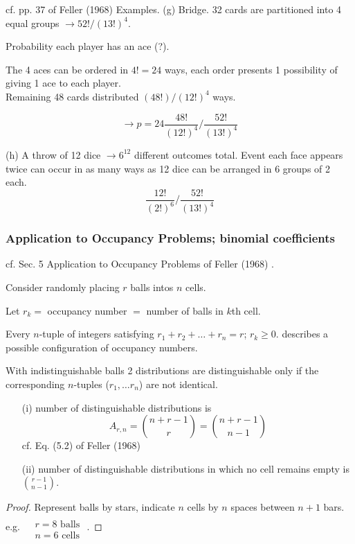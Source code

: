 \documentclass[10pt]{amsart}
\begin{document}
\begin{multicols*}{2}
cf. pp. 37 of Feller (1968)  \cite{Fell1968}
Examples.  (g) Bridge.  32 cards are partitioned into 4 equal groups $\to 52!/(13!)^4$.  

Probability each player has an ace (?).  

The 4 aces can be ordered in $4! = 24$ ways, each order presents 1 possibility of giving 1 ace to each player.  \\
Remaining 48 cards distributed $(48!)/( 12!)^4$ ways.  

\[
\to p = 24 \frac{ 48!}{ (12!)^4 } / \frac{ 52!}{ (13!)^4}
\]

(h) A throw of 12 dice $\to  6^{12}$ different outcomes total.  Event each face appears twice can occur in as many ways as 12 dice can be arranged in 6 groups of 2 each.  
\[
\frac{12!}{(2!)^6} / \frac{ 52!}{ (13!)^4} 
\]

\subsubsection{Application to Occupancy Problems; binomial coefficients}

cf. Sec. 5 Application to Occupancy Problems of Feller (1968)  \cite{Fell1968}.  

Consider randomly placing $r$ balls intos $n$ cells.  

Let $r_k = $ occupancy number $=$ number of balls in $k$th cell.  

Every $n$-tuple of integers satisfying $r_1 + r_2 + \dots + r_n = r$;  $r_k \geq 0$.  describes a possible configuration of occupancy numbers.  

With indistinguishable balls 2 distributions are distinguishable only if the corresponding $n$-tuples ($r_1,\dots r_n$) are not identical.  

\begin{enumerate}
\item[(i)] number of distinguishable distributions is 
\begin{equation}
A_{r,n} = \binom{n+r-1}{r} = \binom{n+r-1}{n-1}  
\end{equation} cf. Eq. (5.2) of Feller (1968)  \cite{Fell1968}
\item[(ii)]  number of distinguishable distributions in which no cell remains empty is $\binom{r-1}{n-1}$.  
\end{enumerate}

\begin{proof}
Represent balls by stars, indicate $n$ cells by $n$ spaces between $n+1$ bars.  e.g. $\begin{aligned} & \quad \\ 
& r= 8 \text{ balls } \\
& n = 6 \text{ cells } \end{aligned}$.  


\end{proof}
\end{multicols*}
\end{document}
